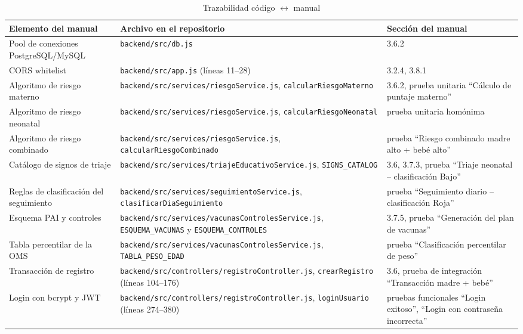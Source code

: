 \documentclass[12pt,letterpaper]{article}
\begin{document}
\begin{longtable}{p{}p{}p{}}
\caption{Trazabilidad código $\leftrightarrow$ manual}\\\toprule
\textbf{Elemento del manual} & \textbf{Archivo en el repositorio} & \textbf{Sección del manual} \\\midrule
\endhead
Pool de conexiones PostgreSQL/MySQL & \texttt{backend/src/db.js} & 3.6.2\\\hline
CORS whitelist & \texttt{backend/src/app.js} (líneas 11--28) & 3.2.4, 3.8.1\\\hline
Algoritmo de riesgo materno & \texttt{backend/src/services/riesgoService.js}, \texttt{calcularRiesgoMaterno} & 3.6.2, prueba unitaria ``Cálculo de puntaje materno''\\\hline
Algoritmo de riesgo neonatal & \texttt{backend/src/services/riesgoService.js}, \texttt{calcularRiesgoNeonatal} & prueba unitaria homónima\\\hline
Algoritmo de riesgo combinado & \texttt{backend/src/services/riesgoService.js}, \texttt{calcularRiesgoCombinado} & prueba ``Riesgo combinado madre alto + bebé alto''\\\hline
Catálogo de signos de triaje & \texttt{backend/src/services/triajeEducativoService.js}, \texttt{SIGNS\_CATALOG} & 3.6, 3.7.3, prueba ``Triaje neonatal -- clasificación Bajo''\\\hline
Reglas de clasificación del seguimiento & \texttt{backend/src/services/seguimientoService.js}, \texttt{clasificarDiaSeguimiento} & prueba ``Seguimiento diario -- clasificación Roja''\\\hline
Esquema PAI y controles & \texttt{backend/src/services/vacunasControlesService.js}, \texttt{ESQUEMA\_VACUNAS} y \texttt{ESQUEMA\_CONTROLES} & 3.7.5, prueba ``Generación del plan de vacunas''\\\hline
Tabla percentilar de la OMS & \texttt{backend/src/services/vacunasControlesService.js}, \texttt{TABLA\_PESO\_EDAD} & prueba ``Clasificación percentilar de peso''\\\hline
Transacción de registro & \texttt{backend/src/controllers/registroController.js}, \texttt{crearRegistro} (líneas 104--176) & 3.6, prueba de integración ``Transacción madre + bebé''\\\hline
Login con bcrypt y JWT & \texttt{backend/src/controllers/registroController.js}, \texttt{loginUsuario} (líneas 274--380) & pruebas funcionales ``Login exitoso'', ``Login con contraseña incorrecta''\\\hline

\end{longtable}
\end{document}
